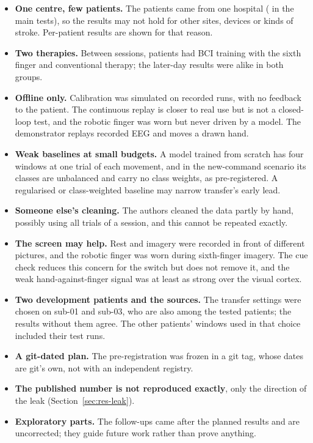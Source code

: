 \begin{itemize}
  \item \textbf{One centre, few patients.} The \nSubjects{} patients came from one hospital
  (\nPre{} in the main tests), so the results may not hold for other sites, devices or kinds
  of stroke. Per-patient results are shown for that reason.
  \item \textbf{Two therapies.} Between sessions, \nPostGroupB{} patients had BCI training
  with the sixth finger and \nPostGroupT{} conventional therapy; the later-day results were
  alike in both groups.
  \item \textbf{Offline only.} Calibration was simulated on recorded runs, with no feedback
  to the patient. The continuous replay is closer to real use but is not a closed-loop
  test, and the robotic finger was worn but never driven by a model. The demonstrator
  replays recorded EEG and moves a drawn hand.
  \item \textbf{Weak baselines at small budgets.} A model trained from scratch has four
  windows at one trial of each movement, and in the new-command scenario its classes are
  unbalanced and carry no class weights, as pre-registered. A regularised or
  class-weighted baseline may narrow transfer's early lead.
  \item \textbf{Someone else's cleaning.} The authors cleaned the data partly by hand,
  possibly using all trials of a session, and this cannot be repeated exactly.
  \item \textbf{The screen may help.} Rest and imagery were recorded in front of
  different pictures, and the robotic finger was worn during sixth-finger imagery. The
  cue check reduces this concern for the switch but does not remove it, and the weak
  hand-against-finger signal was at least as strong over the visual cortex.
  \item \textbf{Two development patients and the sources.} The transfer settings were
  chosen on sub-01 and sub-03, who are also among the tested patients; the results without
  them agree. The other patients' windows used in that choice included their test runs.
  \item \textbf{A git-dated plan.} The pre-registration was frozen in a git tag, whose
  dates are git's own, not with an independent registry.
  \item \textbf{The published number is not reproduced exactly}, only the direction of the
  leak (Section~\ref{sec:res-leak}).
  \item \textbf{Exploratory parts.} The follow-ups came after the planned results and are
  uncorrected; they guide future work rather than prove anything.
\end{itemize}
